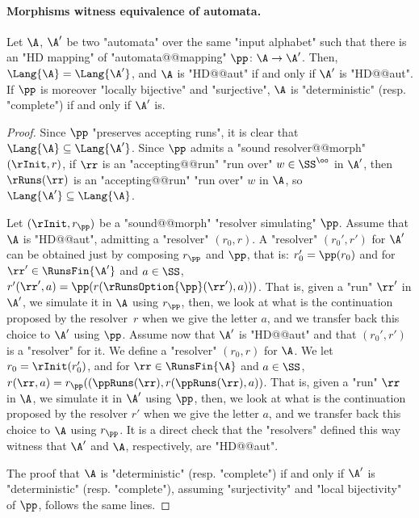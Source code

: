 \documentclass{theoretics}
\begin{document}
\paragraph*{Morphisms witness equivalence of automata.}
\begin{proposition}\label{prop-morph:HD mappings-preserve-languages}
	Let $\A$, $\A'$ be two "automata" over the same "input alphabet" such that there is an "HD mapping" of "automata@@mapping" $\pp\colon \A \to \A'$. Then, $\Lang{\A}=\Lang{\A'}$, and $\A$ is "HD@@aut" if and only if $\A'$ is "HD@@aut".
	If $\pp$ is moreover "locally bijective" and "surjective", $\A$ is "deterministic" (resp. "complete") if and only if $\A'$ is.
\end{proposition}
\begin{proof}
	Since $\pp$ "preserves accepting runs", it is clear that $\Lang{\A}\subseteq \Lang{\A'}$. Since $\pp$ admits a "sound resolver@@morph" $(\rInit, r)$, if $\rr$ is an "accepting@@run" "run over" $w\in \SS^\oo$ in $\A'$, then $\rRuns(\rr)$ is an "accepting@@run" "run over" $w$ in $\A$, so $\Lang{\A'}\subseteq \Lang{\A}$.
	
	Let $(\rInit, r_\pp)$ be a "sound@@morph" "resolver simulating" $\pp$.
	Assume that $\A$ is "HD@@aut", admitting a "resolver" $(r_0,r)$. A "resolver" $(r_0',r')$ for $\A'$ can be obtained just by composing $r_\pp$ and $\pp$, that is: $r_0' = \pp(r_0)$ and for $\rr'\in \RunsFin{\A'}$ and $a\in \SS$, $r'(\rr', a) = \pp(r(\rRunsOption{\pp}(\rr'),a)))$. That is, given a "run" $\rr'$ in $\A'$, we simulate it in $\A$ using $r_\pp$, then, we look at what is the continuation proposed by the resolver~$r$ when we give the letter $a$, and we transfer back this choice to $\A'$ using $\pp$. 
	Assume now that $\A'$ is "HD@@aut" and that $(r_0',r')$ is a "resolver" for it. We define a "resolver" $(r_0,r)$ for $\A$. We let $r_0 = \rInit(r_0')$, and for $\rr\in \RunsFin{\A}$ and $a\in \SS$, $r(\rr, a) = r_\pp((\ppRuns(\rr), r(\ppRuns(\rr),a))$. That is, given a "run" $\rr$ in $\A$, we simulate it in $\A'$ using $\pp$, then, we look at what is the continuation proposed by the resolver $r'$ when we give the letter $a$, and we transfer back this choice to $\A$ using $r_\pp$. 
	It is a direct check that the "resolvers" defined this way witness that $\A'$ and $\A$, respectively, are "HD@@aut".
	
	 The proof that $\A$ is "deterministic" (resp. "complete") if and only if $\A'$ is "deterministic" (resp. "complete"), assuming "surjectivity" and "local bijectivity" of $\pp$, follows the same lines.
\end{proof}
\end{document}
